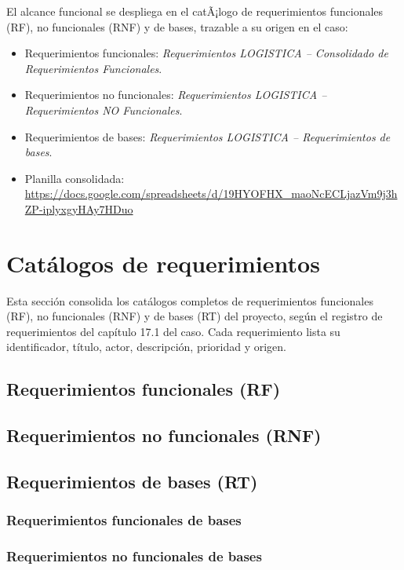 El alcance funcional se despliega en el catÃ¡logo de requerimientos funcionales (RF),
no funcionales (RNF) y de bases, trazable a su origen en el caso:

\begin{itemize}
  \item Requerimientos funcionales: \emph{Requerimientos LOGISTICA -- Consolidado de
        Requerimientos Funcionales}.
  \item Requerimientos no funcionales: \emph{Requerimientos LOGISTICA -- Requerimientos
        NO Funcionales}.
  \item Requerimientos de bases: \emph{Requerimientos LOGISTICA -- Requerimientos de
        bases}.
\item Planilla consolidada:
        \url{https://docs.google.com/spreadsheets/d/19HYOFHX_maoNcECLjazVm9j3hZP-iplyxgyHAy7HDuo}
\end{itemize}

\section{Cat\'alogos de requerimientos}

Esta secci\'on consolida los cat\'alogos completos de requerimientos funcionales
(RF), no funcionales (RNF) y de bases (RT) del proyecto, seg\'un el registro de
requerimientos del cap\'itulo 17.1 del caso. Cada requerimiento lista su
identificador, t\'itulo, actor, descripci\'on, prioridad y origen.

\subsection{Requerimientos funcionales (RF)}


\subsection{Requerimientos no funcionales (RNF)}


\subsection{Requerimientos de bases (RT)}

\subsubsection{Requerimientos funcionales de bases}


\subsubsection{Requerimientos no funcionales de bases}


